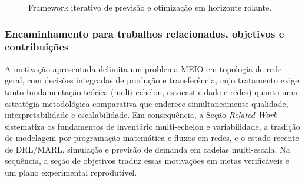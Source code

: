 \begin{figure}[htbp]
\centering
{}
\caption{Framework iterativo de previsão e otimização em horizonte rolante.}
\label{fig:framework_iterativo}
\end{figure}

\subsubsection*{Encaminhamento para trabalhos relacionados, objetivos e contribuições}

A motivação apresentada delimita um problema MEIO em topologia de rede geral, com decisões integradas de produção e transferência, cujo tratamento exige tanto fundamentação teórica (multi-echelon, estocasticidade e redes) quanto uma estratégia metodológica comparativa que enderece simultaneamente qualidade, interpretabilidade e escalabilidade. Em consequência, a Seção \emph{Related Work} sistematiza os fundamentos de inventário multi-echelon e variabilidade, a tradição de modelagem por programação matemática e fluxos em redes, e o estado recente de DRL/MARL, simulação e previsão de demanda em cadeias multi-escala. Na sequência, a seção de objetivos traduz essas motivações em metas verificáveis e um plano experimental reprodutível.


